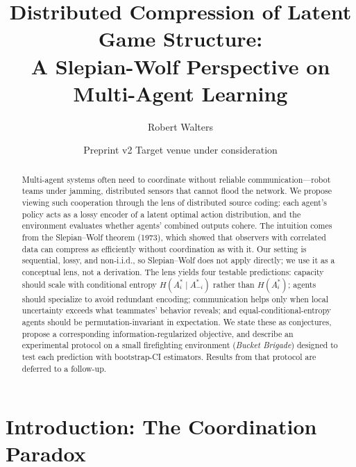 \documentclass[10pt, letterpaper]{article}
\title{Distributed Compression of Latent Game Structure:\\ A Slepian-Wolf Perspective on Multi-Agent Learning}
\author{Robert Walters}
\date{Preprint v2 \quad\textbar\quad Target venue under consideration}
\begin{document}
\maketitle

\begin{center}
\end{center}

\begin{abstract}
Multi-agent systems often need to coordinate without reliable communication---robot teams under jamming, distributed sensors that cannot flood the network. We propose viewing such cooperation through the lens of distributed source coding: each agent's policy acts as a lossy encoder of a latent optimal action distribution, and the environment evaluates whether agents' combined outputs cohere. The intuition comes from the Slepian--Wolf theorem (1973), which showed that observers with correlated data can compress as efficiently without coordination as with it. Our setting is sequential, lossy, and non-i.i.d., so Slepian--Wolf does not apply directly; we use it as a conceptual lens, not a derivation. The lens yields four testable predictions: capacity should scale with conditional entropy $H(A_i^* \mid A_{-i}^*)$ rather than $H(A_i^*)$; agents should specialize to avoid redundant encoding; communication helps only when local uncertainty exceeds what teammates' behavior reveals; and equal-conditional-entropy agents should be permutation-invariant in expectation. We state these as conjectures, propose a corresponding information-regularized objective, and describe an experimental protocol on a small firefighting environment (\emph{Bucket Brigade}) designed to test each prediction with bootstrap-CI estimators. Results from that protocol are deferred to a follow-up.
\end{abstract}

\section{Introduction: The Coordination Paradox}
\label{sec:introduction}
\end{document}
